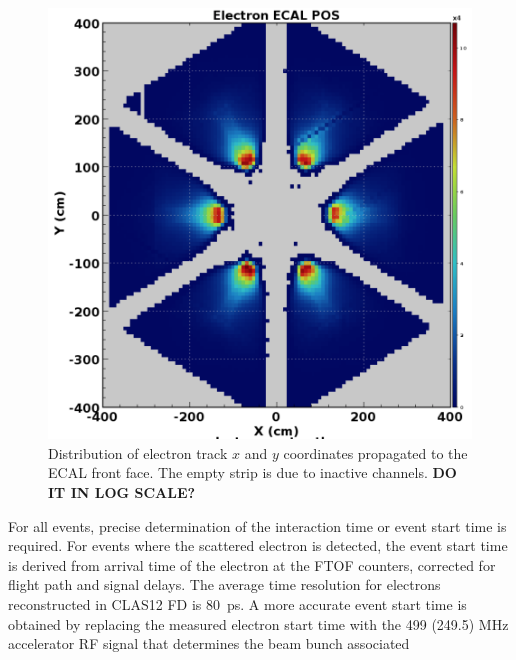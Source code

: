 \documentclass[final,3p,twocolumn]{elsarticle}
\begin{document}
\begin{figure}[htbp!]
\centerline{\includegraphics[width=1.0\columnwidth]{ElectronsOnPCAL.png}}
\caption{Distribution of electron track $x$ and $y$ coordinates propagated to the ECAL front face. The empty strip 
is due to inactive channels. {\bf DO IT IN LOG SCALE?}} 
\label{electrons-xy}
\end{figure}
For all events, precise determination of the interaction time or event start time is required. For events where the scattered electron is detected, the event start time is derived from arrival time of the electron at the FTOF counters, 
corrected for flight path and signal delays.  The average time resolution for electrons reconstructed in CLAS12 FD is 80~ps. A more accurate event start time is obtained by replacing the measured 
electron start time with the 499 (249.5) MHz accelerator RF signal that determines the beam bunch associated 
\end{document}
